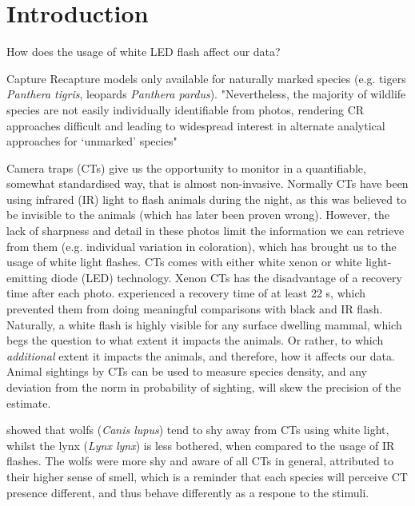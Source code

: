 \chapter{Introduction}


How does the usage of white LED flash affect our data?





Capture Recapture models only available for naturally marked species (e.g. tigers \textit{Panthera tigris}, leopards \textit{Panthera pardus}). 
"Nevertheless, the majority of wildlife species are not easily individually identifiable from photos, rendering CR approaches difficult and leading to widespread interest in alternate analytical approaches for ‘unmarked’ species" \cite{Burton2015} %


Camera traps (CTs) give us the opportunity to monitor in a quantifiable, somewhat standardised way, that is almost non-invasive. 
Normally CTs have been using infrared (IR) light to flash animals during the night, as this was believed to be invisible to the animals (which has later been proven wrong). %
However, the lack of sharpness and detail in these photos limit the information we can retrieve from them (e.g. individual variation in coloration), which has brought us to the usage of white light flashes.
CTs comes with either white xenon or white light-emitting diode (LED) technology.
Xenon CTs has the disadvantage of a recovery time after each photo. \cite{Henrich2020} experienced a recovery time of at least 22 s, which prevented them from doing meaningful comparisons with black and IR flash. 
Naturally, a white flash is highly visible for any surface dwelling mammal, which begs the question to what extent it impacts the animals. Or rather, to which \textit{additional} extent it impacts the animals, and therefore, how it affects our data.
Animal sightings by CTs can be used to measure species density, and any deviation from the norm in probability of sighting, will skew the precision of the estimate.


\cite{Beddari2019} showed that wolfs (\textit{Canis lupus}) tend to shy away from CTs using white light, whilst the lynx (\textit{Lynx lynx}) is less bothered, when compared to the usage of IR flashes. %
The wolfs were more shy and aware of all CTs in general, attributed to their higher sense of smell, which is a reminder that each species will perceive CT presence different, and thus behave differently as a respone to the stimuli.

